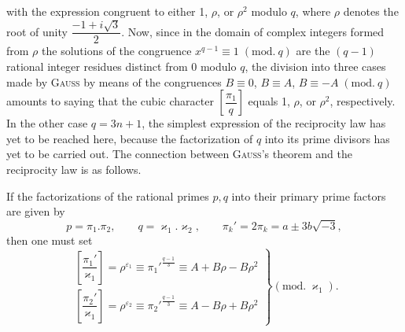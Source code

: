 \noindent\unskip{}with the expression congruent to either 1, $\rho$, or $\rho^2$ modulo $q$, where $\rho$ denotes the root of unity
$\dfrac{-1+i\sqrt{3}}{2}$. Now, since in the domain of complex integers formed from $\rho$ the solutions
of the congruence $x^{q-1}\equiv 1\;(\mathrm{mod.}\ q)$ are the $(q-1)$ rational integer residues distinct from 0 modulo $q$,
the division into three cases made by \textsc{Gauss} by means of the congruences $B\equiv 0$, $B\equiv A$, $B\equiv -A\;(\mathrm{mod.}\ q)$ amounts to saying that the cubic character $\left[\dfrac{\pi_1}{q}\right]$ equals 1, $\rho$, or $\rho^2$, respectively. In the other case $q=3n+1$,
the simplest expression of the reciprocity law has yet to be reached here, because the factorization of
$q$ into its prime divisors has yet to be carried out. The connection between \textsc{Gauss}'s theorem and the reciprocity law is as follows.

If the factorizations of the rational primes $p, q$ into their primary prime factors are given by
\[ p=\pi_1.\pi_2,\qquad q=\varkappa_1.\varkappa_2,\qquad \pi_k'=2\pi_k=a\pm 3b\sqrt{-3}, \]
then one must set
\[
\left.\begin{array}{l}
\left[\dfrac{\pi_1'}{\varkappa_1}\right]=\rho^{\varepsilon_1}\equiv {\pi_1'}^{\frac{q-1}{3}}\equiv A+B\rho-B\rho^2 \\[2mm]
\left[\dfrac{\pi_2'}{\varkappa_1}\right]=\rho^{\varepsilon_2}\equiv {\pi_2'}^{\frac{q-1}{3}}\equiv A-B\rho+B\rho^2
\end{array}\right\}(\mathrm{mod.}\ \varkappa_1).
\]

